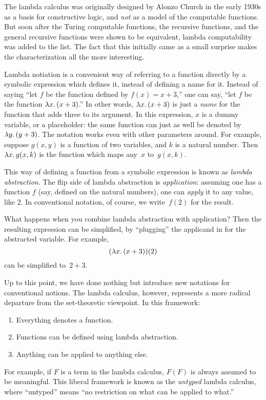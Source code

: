 \documentclass[../../include/open-logic-section]{subfiles}
\begin{document}

The lambda calculus was originally designed by Alonzo Church in the
early 1930s as a basis for constructive logic, and \emph{not} as a
model of the computable functions. But soon after the Turing
computable functions, the recursive functions, and the general
recursive functions were shown to be equivalent, lambda computability
was added to the list. The fact that this initially came as a small
surprise makes the characterization all the more interesting.

Lambda notiation is a convenient way of referring to a function
directly by a symbolic expression which defines it, instead of
defining a name for it. Instead of saying ``let $f$ be the function
defined by $f(x) = x + 3$,'' one can say, ``let $f$ be the function
$\lambd[x][(x + 3)]$.''  In other words, $\lambd[x][(x+3)]$ is just a
\emph{name} for the function that adds three to its argument. In this
expression, $x$ is a dummy variable, or a placeholder: the same
function can just as well be denoted by $\lambd[y][(y + 3)]$. The
notation works even with other parameters around. For example, suppose
$g(x, y)$ is a function of two variables, and $k$ is a natural
number. Then $\lambd[x][g(x,k)]$ is the function which maps any~$x$
to~$g(x, k)$.

This way of defining a function from a symbolic expression is known as
\emph{lambda abstraction}. The flip side of lambda abstraction is
\emph{application}: assuming one has a function $f$ (say, defined on
the natural numbers), one can \emph{apply} it to any value, like 2. In
conventional notation, of course, we write~$f(2)$ for the result.

What happens when you combine lambda abstraction with application?
Then the resulting expression can be simplified, by ``plugging'' the
applicand in for the abstracted variable. For example, 
\[
(\lambd[x][(x + 3)])(2)
\]
can be simplified to~$2 + 3$.

Up to this point, we have done nothing but introduce new notations for
conventional notions. The lambda calculus, however, represents a more
radical departure from the set-theoretic viewpoint. In this framework:
\begin{enumerate}
\item Everything denotes a function.
\item Functions can be defined using lambda abstraction.
\item Anything can be applied to anything else.
\end{enumerate}
For example, if $F$ is a term in the lambda calculus, $F(F)$ is always
assumed to be meaningful. This liberal framework is known as the
\emph{untyped} lambda calculus, where ``untyped'' means ``no
restriction on what can be applied to what.'' 
\end{document}
